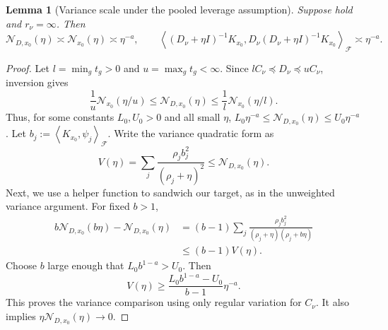 \documentclass[11pt]{article}
\newtheorem{lemma}{Lemma}[section]
\newcommand{\F}{\mathcal{F}}
\newcommand{\Ncal}{\mathcal{N}}
\newcommand{\inner}[2]{\left\langle #1,#2\right\rangle}
\begin{document}
\begin{lemma}[Variance scale under the pooled leverage assumption]\label{lem:weighted_scale}
Suppose  hold and $r_\nu=\infty$. Then
\[
 \Ncal_{D,x_0}(\eta)\asymp\Ncal_{x_0}(\eta)\asymp\eta^{-a},
 \qquad
 \inner{(D_\nu+\eta I)^{-1}K_{x_0}}
 {D_\nu(D_\nu+\eta I)^{-1}K_{x_0}}_{\F}\asymp\eta^{-a}.
\]
\end{lemma}
\begin{proof}
Let $l=\min_gt_g>0$ and $u=\max_gt_g<\infty$. Since $lC_\nu\preceq D_\nu\preceq uC_\nu$, inversion gives
\[
 \frac1u\Ncal_{x_0}(\eta/u)\leq\Ncal_{D,x_0}(\eta)
 \leq\frac1l\Ncal_{x_0}(\eta/l).
\]
Thus, for some constants $L_0,U_0>0$ and all small $\eta$,
$L_0\eta^{-a}\leq\Ncal_{D,x_0}(\eta)\leq U_0\eta^{-a}$.
Let $b_j:=\inner{K_{x_0}}{\psi_j}_{\F}$. Write the variance quadratic form as
\[
 V(\eta)=\sum_j\frac{\rho_jb_j^2}{(\rho_j+\eta)^2}\leq\Ncal_{D,x_0}(\eta).
\]
Next, we use a helper function to sandwich our target, as in the unweighted variance argument. For fixed $b>1$,
\begin{align*}
 b\Ncal_{D,x_0}(b\eta)-\Ncal_{D,x_0}(\eta)
 &=(b-1)\sum_j\frac{\rho_jb_j^2}{(\rho_j+\eta)(\rho_j+b\eta)}\\
 &\leq(b-1)V(\eta).
\end{align*}
Choose $b$ large enough that $L_0b^{1-a}>U_0$. Then
\[
 V(\eta)\geq\frac{L_0b^{1-a}-U_0}{b-1}\eta^{-a}.
\]
This proves the variance comparison using only regular variation for $C_\nu$. It also implies $\eta\Ncal_{D,x_0}(\eta)\to0$.
\end{proof}
\end{document}
